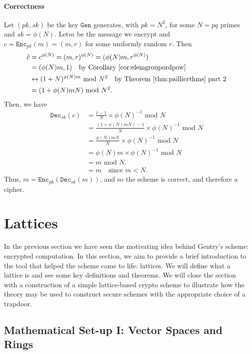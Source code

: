 \documentclass{article}
\theoremstyle{definition}
\newcommand{\Enc}{\texttt{Enc}}
\newcommand{\Dec}{\texttt{Dec}}
\newcommand{\Gen}{\texttt{Gen}}
\renewcommand{\mod}{\,\,\text{mod}\,\,}
\begin{document}
\paragraph{Correctness}
Let $(pk, sk)$ be the key $\Gen$ generates, with $pk = N^2$, for some $N = pq$
primes and $sk = \phi(N)$. Let$m$ be the message we encrypt and $c =
\Enc_{pk}(m) =(m, r)$ for some uniformly random $r$. Then
\begin{align*}
  \hat{c} &= c^{\phi(N)} = (m, r)^{\phi(N)} = (\phi(N)m, r^{\phi(N)}) \\
          &= (\phi(N)m, 1) \quad \text{by Corollary \ref{cor:elemgroupordpow}}\\
          &\leftrightarrow (1 + N)^{\phi(N)m} \mod N^2 \quad \text{by Theorem \ref{thm:paillierthms} part 2}\\
          &= (1 + \phi(N)mN) \mod N^2.
\end{align*}
Then, we have
\begin{align*}
  \Dec_{sk}(c) &= \frac{\hat{c} - 1}{N} \times \phi(N)^{-1} \mod N\\
               &= \frac{(1 + \phi(N)mN) - 1}{N} \times \phi(N)^{-1} \mod N\\
               &= \frac{\phi(N)mN}{N}\times \phi(N)^{-1} \mod N\\
               &= \phi(N)m \times \phi(N)^{-1} \mod N \\
               &= m \mod N. \\
               &= m \quad \text{since } m < N.
\end{align*}
Thus, $m = \Enc_{pk}(\Dec_{sk}(m))$, and so the scheme is correct, and therefore
a cipher.
\section{Lattices}
\paragraph{}
In the previous section we have seen the motivating idea behind Gentry's scheme:
encrypted computation. In this section, we aim to provide a brief introduction
to the tool that helped the scheme come to life: lattices. We will define what a
lattice is and see some key definitions and theorems. We will close the section
with a construction of a simple lattice-based crypto scheme to illustrate how
the theory may be used to construct secure schemes with the appropriate choice
of a trapdoor.
\subsection{Mathematical Set-up I: Vector Spaces and Rings}
\end{document}
